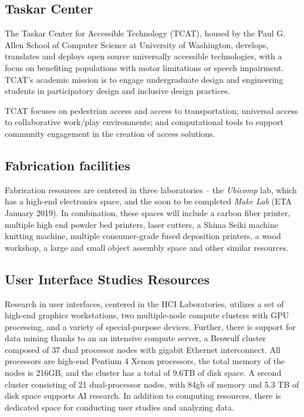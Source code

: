 
\subsection{Taskar Center}

The Taskar Center for Accessible Technology (TCAT), housed by the Paul G. Allen School of Computer Science at University of Washington, develops, translates and deploys open source universally accessible technologies, with a focus on benefiting populations with motor limitations or speech impairment.
TCAT's academic mission is to engage undergraduate design and engineering students in participatory design and inclusive design practices.

TCAT focuses on
pedestrian access and access to transportation;
universal access to collaborative work/play environments; and 
computational tools to support community engagement in the creation of access solutions.

\subsection{Fabrication facilities}
Fabrication resources are centered in three laboratories – the \textit{Ubicomp} lab, which has a high-end electronics space, and the soon to be completed \textit{Make Lab }(ETA January 2019). In combination, these spaces will include a carbon fiber printer, multiple high end powder bed printers, laser cutters, a Shima Seiki machine knitting machine, multiple consumer-grade fused deposition printers, a wood workshop, a large and small object assembly space and other similar resources.   

\subsection{User Interface Studies Resources} 
Research in user interfaces, centered in the HCI Laboratories, utilizes a set of high-end graphics workstations, two multiple-node compute clusters with GPU processing, and a variety of special-purpose devices. Further, there is support for data mining thanks to an an intensive compute server, a Beowulf cluster composed of 37 dual processor nodes with gigabit Ethernet interconnect. All processors are high-end Pentium 4 Xenon processors, the total memory of the nodes is 216GB, and the cluster has a total of 9.6TB of disk space. A second cluster consisting of 21 dual-processor nodes, with 84gb of memory and 5.3 TB of disk space supports AI research. In addition to computing resources, there is dedicated space for conducting user studies and analyzing data. 

